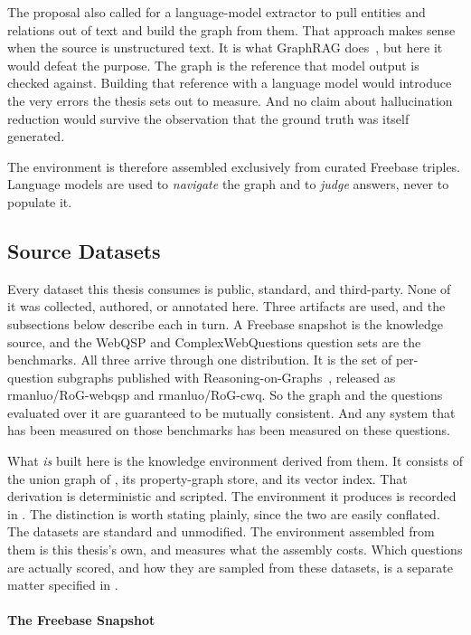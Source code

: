 The proposal also called for a language-model extractor to pull entities and
relations out of text and build the graph from them. That approach makes sense
when the source is unstructured text. It is what GraphRAG
does~\cite{edge2024local}, but here it would defeat the purpose. The graph is
the reference that model output is checked against. Building that reference with
a language model would introduce the very errors the thesis sets out to measure.
And no claim about hallucination reduction would survive the observation that
the ground truth was itself generated.

The environment is therefore assembled exclusively from curated Freebase
triples. Language models are used to \emph{navigate} the graph and to
\emph{judge} answers, never to populate it.

\subsection{Source Datasets}\label{sec:source-data}

Every dataset this thesis consumes is public, standard, and third-party. None of
it was collected, authored, or annotated here. Three artifacts are used, and the
subsections below describe each in turn. A Freebase snapshot is
the knowledge source, and the WebQSP and ComplexWebQuestions question sets are
the benchmarks. All three arrive through one distribution. It is the set of
per-question subgraphs published with
Reasoning-on-Graphs~\cite{luo2024reasoning}, released as
\textsf{rmanluo/RoG-webqsp} and \textsf{rmanluo/RoG-cwq}. So the graph and the
questions evaluated over it are guaranteed to be mutually consistent. And any
system that has been measured on those benchmarks has been measured on these
questions.

What \emph{is} built here is the knowledge environment derived from them. It
consists of the union graph of , its property-graph
store, and its vector index. That derivation is deterministic and scripted. The
environment it produces is recorded in . The distinction is
worth stating plainly, since the two are easily conflated. The datasets are
standard and unmodified. The environment assembled from them is this thesis's
own, and  measures what the assembly costs. Which
questions are actually scored, and how they are sampled from these datasets, is
a separate matter specified in .

\paragraph{The Freebase Snapshot}

